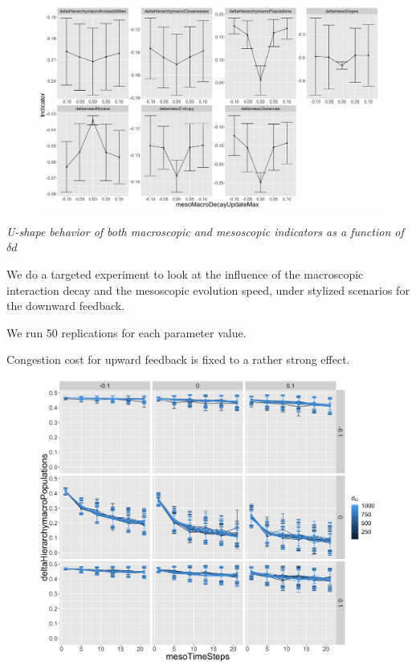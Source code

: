 \documentclass[11pt]{article}
\begin{document}
\begin{figure}
\includegraphics[width=\textwidth]{figures/onefactor_allindics_mesoMacroDecayUpdateMax_errorbars.png}
\end{figure}

\textit{U-shape behavior of both macroscopic and mesoscopic indicators as a function of $\delta d$}



We do a targeted experiment to look at the influence of the macroscopic interaction decay and the mesoscopic evolution speed, under stylized scenarios for the downward feedback.

We run 50 replications for each parameter value.

Congestion cost for upward feedback is fixed to a rather strong effect.

\begin{figure}
\includegraphics[height=0.75\textheight]{figures/deltaHierarchymacroPopulations-mesoTimeSteps_colorMacroInteractionDecay_facetmesoMacroDecayUpdateMax-macroMesoBetaUpdateMax.png}
\end{figure}
\end{document}

